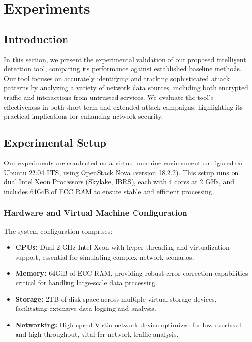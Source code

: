 \section{Experiments}\label{sec:exps}
\subsection{Introduction}\label{sec:intro-experiments}
In this section, we present the experimental validation of our proposed intelligent detection tool, comparing its performance against established baseline methods. Our tool focuses on accurately identifying and tracking sophisticated attack patterns by analyzing a variety of network data sources, including both encrypted traffic and interactions from untrusted services. We evaluate the tool's effectiveness in both short-term and extended attack campaigns, highlighting its practical implications for enhancing network security.

\subsection{Experimental Setup}\label{sec:experimental-setup}
Our experiments are conducted on a virtual machine environment configured on Ubuntu 22.04 LTS, using OpenStack Nova (version 18.2.2). This setup runs on dual Intel Xeon Processors (Skylake, IBRS), each with 4 cores at 2 GHz, and includes 64GiB of ECC RAM to ensure stable and efficient processing.

\subsubsection{Hardware and Virtual Machine Configuration}
The system configuration comprises:
\begin{itemize}
    \item \textbf{CPUs:} Dual 2 GHz Intel Xeon with hyper-threading and virtualization support, essential for simulating complex network scenarios.
    \item \textbf{Memory:} 64GiB of ECC RAM, providing robust error correction capabilities critical for handling large-scale data processing.
    \item \textbf{Storage:} 2TB of disk space across multiple virtual storage devices, facilitating extensive data logging and analysis.
    \item \textbf{Networking:} High-speed Virtio network device optimized for low overhead and high throughput, vital for network traffic analysis.
\end{itemize}

